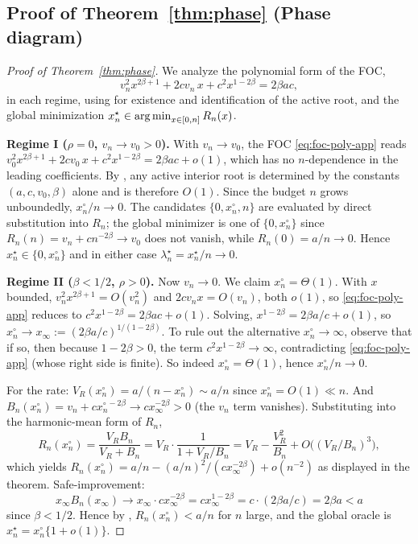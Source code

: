 \subsection{Proof of \texorpdfstring{Theorem~\ref{thm:phase}}{Theorem~\ref{thm:phase}} (Phase diagram)}\label{proof:phase}

\begin{proof}[Proof of Theorem~\ref{thm:phase}]
We analyze the polynomial form of the FOC,
\begin{equation}\label{eq:foc-poly-app}
v_n^2 x^{2\beta+1} + 2 c v_n\, x + c^2 x^{1-2\beta} = 2 \beta a c,
\end{equation}
in each regime, using  for existence and identification of the active root, and the global minimization $x_n^\star \in \operatorname*{arg\,min}_{x \in [0,n]} R_n(x)$.

\medskip
\noindent\textbf{Regime I ($\rho = 0$, $v_n \to v_0 > 0$).} With $v_n \to v_0$, the FOC \cref{eq:foc-poly-app} reads $v_0^2 x^{2\beta+1} + 2 c v_0\, x + c^2 x^{1-2\beta} = 2\beta a c + o(1)$, which has no $n$-dependence in the leading coefficients. By , any active interior root is determined by the constants $(a, c, v_0, \beta)$ alone and is therefore $O(1)$. Since the budget $n$ grows unboundedly, $x_n^\circ / n \to 0$. The candidates $\{0, x_n^\circ, n\}$ are evaluated by direct substitution into $R_n$; the global minimizer is one of $\{0, x_n^\circ\}$ since $R_n(n) = v_n + c n^{-2\beta} \to v_0$ does not vanish, while $R_n(0) = a/n \to 0$. Hence $x_n^\star \in \{0, x_n^\circ\}$ and in either case $\lambda_n^\star = x_n^\star / n \to 0$.

\medskip
\noindent\textbf{Regime II ($\beta < 1/2$, $\rho > 0$).} Now $v_n \to 0$. We claim $x_n^\circ = \Theta(1)$. With $x$ bounded, $v_n^2 x^{2\beta+1} = O(v_n^2)$ and $2 c v_n x = O(v_n)$, both $o(1)$, so \cref{eq:foc-poly-app} reduces to $c^2 x^{1-2\beta} = 2\beta a c + o(1)$. Solving, $x^{1-2\beta} = 2\beta a / c + o(1)$, so $x_n^\circ \to x_\infty := (2\beta a / c)^{1/(1-2\beta)}$. To rule out the alternative $x_n^\circ \to \infty$, observe that if so, then because $1 - 2\beta > 0$, the term $c^2 x^{1-2\beta} \to \infty$, contradicting \cref{eq:foc-poly-app} (whose right side is finite). So indeed $x_n^\circ = \Theta(1)$, hence $x_n^\circ / n \to 0$.

For the rate: $V_R(x_n^\circ) = a/(n - x_n^\circ) \sim a/n$ since $x_n^\circ = O(1) \ll n$. And $B_n(x_n^\circ) = v_n + c x_n^{\circ\, -2\beta} \to c x_\infty^{-2\beta} > 0$ (the $v_n$ term vanishes). Substituting into the harmonic-mean form of $R_n$,
\[
R_n(x_n^\circ) = \frac{V_R B_n}{V_R + B_n}
= V_R \cdot \frac{1}{1 + V_R / B_n}
= V_R - \frac{V_R^2}{B_n} + O\bigl((V_R/B_n)^3\bigr),
\]
which yields $R_n(x_n^\circ) = a/n - (a/n)^2 / (c x_\infty^{-2\beta}) + o(n^{-2})$ as displayed in the theorem. Safe-improvement:
\[
x_\infty B_n(x_\infty) \to x_\infty \cdot c x_\infty^{-2\beta}
= c x_\infty^{1 - 2\beta} = c \cdot (2\beta a / c) = 2\beta a < a
\]
since $\beta < 1/2$. Hence by , $R_n(x_n^\circ) < a/n$ for $n$ large, and the global oracle is $x_n^\star = x_n^\circ\{1+o(1)\}$.


\end{proof}
